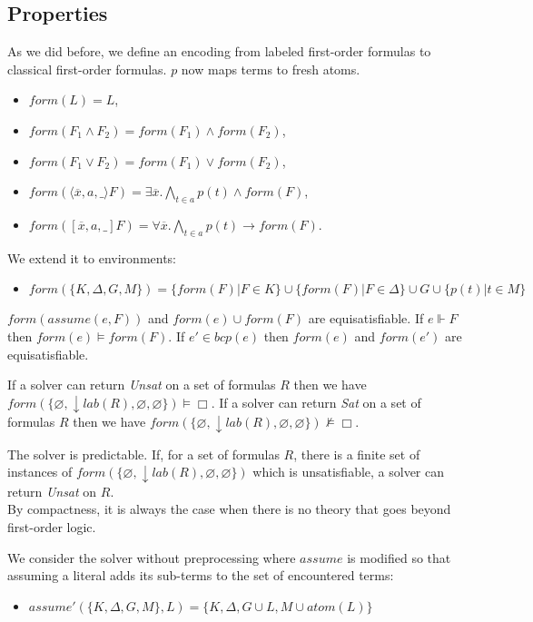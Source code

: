 \documentclass[a4paper,11pt]{article}
\newcommand{\atom}{\mathit{atom}}
\newcommand{\F}{\mathit{form}}
\newcommand{\T}{\mathit{lab}}
\newcommand{\A}{\mathit{assume}}
\newcommand{\B}{\mathit{bcp}}
\begin{document}
\subsection{Properties}
As we did before, we define an encoding from labeled first-order formulas to classical
first-order formulas. $p$ now maps terms to fresh atoms.
\begin{itemize}
 \item $\F(L)=L$,
 \item $\F(F_1\wedge F_2)=\F(F_1)\wedge\F(F_2)$,
 \item $\F(F_1\vee F_2)=\F(F_1)\vee\F(F_2)$,
 \item $\F(\langle\overline x,a,\_\rangle F)=\exists\overline x.\bigwedge_{t\in a} p(t)\wedge\F(F)$,
 \item $\F([\overline x,a,\_]F)=\forall \overline x.\bigwedge_{t\in a} p(t)\rightarrow\F(F)$.
\end{itemize}
We extend it to environments:
\begin{itemize}
 \item $\F(\{K,\Delta,G,M\})=\{\F(F)|F\in K\}\cup\{\F(F)|F\in\Delta\}\cup G\cup\{p(t)|t\in M\}$
\end{itemize}
{\lemma $\F(\A(e,F))$ and $\F(e)\cup\F(F)$ are equisatisfiable.}
{\lemma If $e\Vdash F$ then $\F(e)\vDash\F(F)$.}
{\lemma If $e'\in\B(e)$ then $\F(e)$ and $\F(e')$ are equisatisfiable.}

{\theorem If a solver can return \emph{Unsat} on a set of formulas $R$ then we have
$\F(\{\varnothing,\downarrow\T(R),\varnothing,\varnothing\})\vDash\Box$.}
{\theorem If a solver can return \emph{Sat} on a set of formulas $R$ then we have
$\F(\{\varnothing,\downarrow\T(R),\varnothing,\varnothing\})\nvDash\Box$.}

{\corollary The solver is predictable.}
{\theorem If, for a set of formulas $R$, there is a finite set of instances of
$\F(\{\varnothing,\downarrow\T(R),\varnothing,\varnothing\})$ which is unsatisfiable,
a solver can return \emph{Unsat} on $R$.}\\
By compactness, it is always the case when there is no theory that goes
beyond first-order logic.

We consider the solver without preprocessing where $\A$ is modified so that
assuming a literal adds its sub-terms to the set of encountered terms:
\begin{itemize}
 \item $\A'(\{K,\Delta,G,M\},L) = \{K,\Delta,G\cup L, M\cup\atom(L)\}$
\end{itemize}
\end{document}
